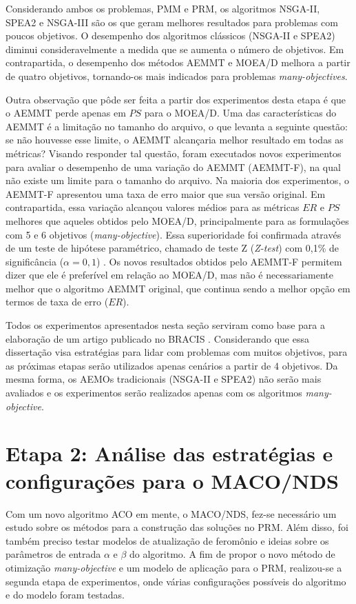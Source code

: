 Considerando ambos os problemas, PMM e PRM, os algoritmos NSGA-II, SPEA2 e NSGA-III são os que geram melhores resultados para problemas com poucos objetivos. O desempenho dos algoritmos clássicos (NSGA-II e SPEA2) diminui consideravelmente a medida que se aumenta o número de objetivos. Em contrapartida, o desempenho dos métodos AEMMT e MOEA/D melhora a partir de quatro objetivos, tornando-os mais indicados para problemas \textit{many-objectives}.

Outra observação que pôde ser feita a partir dos experimentos desta etapa é que o AEMMT perde apenas em $PS$ para o MOEA/D. Uma das características do AEMMT é a limitação no tamanho do arquivo, o que levanta a seguinte questão: se não houvesse esse limite, o AEMMT alcançaria melhor resultado em todas as métricas? Visando responder tal questão, foram executados novos experimentos para avaliar o desempenho de uma variação do AEMMT (AEMMT-F), na qual não existe um limite para o tamanho do arquivo. Na maioria dos experimentos, o AEMMT-F apresentou uma taxa de erro maior que sua versão original. Em contrapartida, essa variação alcançou valores médios para as métricas $ER$ e $PS$ melhores que aqueles obtidos pelo MOEA/D, principalmente para as formulações com 5 e 6 objetivos (\textit{many-objective}). Essa superioridade foi confirmada através de um teste de hipótese paramétrico, chamado de teste Z (\textit{Z-test}) com 0,1\% de significância ($\alpha = 0,1$) \cite{Franca2018}. Os novos resultados obtidos pelo AEMMT-F permitem dizer que ele é preferível em relação ao MOEA/D, mas não é necessariamente melhor que o algoritmo AEMMT original, que continua sendo a melhor opção em termos de taxa de erro ($ER$). 

Todos os experimentos apresentados nesta seção serviram como base para a elaboração de um artigo publicado no \ac{BRACIS} \cite{Franca2017}. Considerando que essa dissertação visa estratégias para lidar com problemas com muitos objetivos, para as próximas etapas serão utilizados apenas cenários a partir de 4 objetivos. Da mesma forma, os AEMOs tradicionais (NSGA-II e SPEA2) não serão mais avaliados e os experimentos serão realizados apenas com os algoritmos \textit{many-objective}.

\section{Etapa 2: Análise das estratégias e configurações para o MACO/NDS}
\label{section_experimentos_etapa2}

Com um novo algoritmo ACO em mente, o MACO/NDS, fez-se necessário um estudo sobre os métodos para a construção das soluções no PRM. Além disso, foi também preciso testar modelos de atualização de feromônio e ideias sobre os parâmetros de entrada $\alpha$ e $\beta$ do algoritmo. A fim de propor o novo método de otimização \textit{many-objective} e um modelo de aplicação para o PRM, realizou-se a segunda etapa de experimentos, onde várias configurações possíveis do algoritmo e do modelo foram testadas.

